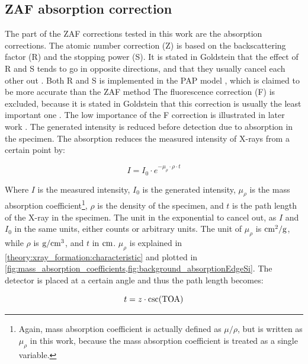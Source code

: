 \subsection{ZAF absorption correction}
\label{theory:quantitative:zaf}

The part of the ZAF corrections tested in this work are the absorption corrections.
The atomic number correction (Z) is based on the backscattering factor (R) and the stopping power (S).
It is stated in Goldstein that the effect of R and S tends to go in opposite directions, and that they usually cancel each other out \cite[p. 300]{goldstein_scanning_2018}.
Both R and S is implemented in the PAP model \cite{pap_1991}, which is claimed to be more accurate than the ZAF method \cite{pap_1991,bastin_proza96_1998,goldstein_scanning_2018}
The fluorescence correction (F) is excluded, because it is stated in Goldstein that this correction is usually the least important one \cite[p. 307]{goldstein_scanning_2018}.
The low importance of the F correction is illustrated in later work \cite{burdet_2014_3dsem}.
The generated intensity is reduced before detection due to absorption in the specimen.
The absorption reduces the measured intensity of X-rays from a certain point by:

\begin{equation}
    \label{eq:theory:quantitative:absorption}
    I = I_0 \cdot e^{-\mu_{\rho} \cdot \rho \cdot t}
\end{equation}

Where $I$ is the measured intensity, $I_0$ is the generated intensity, $\mu_{\rho}$ is the mass absorption coefficient\footnote{Again, mass absorption coefficient is actually defined as $\mu/\rho$, but is written as $\mu_\rho$ in this work, because the mass absorption coefficient is treated as a single variable.},
$\rho$ is the density of the specimen, and $t$ is the path length of the X-ray in the specimen.
The unit in the exponential to cancel out, as $I$ and $I_0$ in the same units, either counts or arbitrary units.
The unit of $\mu_{\rho}$ is $\textnormal{cm}^2/\textnormal{g}$, while $\rho$ is $\textnormal{g}/\textnormal{cm}^3$, and $t$ in $\textnormal{cm}$.
$\mu_{\rho}$ is explained in \cref{theory:xray_formation:characteristic} and plotted in \cref{fig:mass_absorption_coefficients,fig:background_absorptionEdgeSi}.
The detector is placed at a certain angle and thus the path length becomes:

\begin{equation}
    \label{eq:theory:quantitative:path_length}
    t = z \cdot \csc(\textnormal{TOA})
\end{equation}

